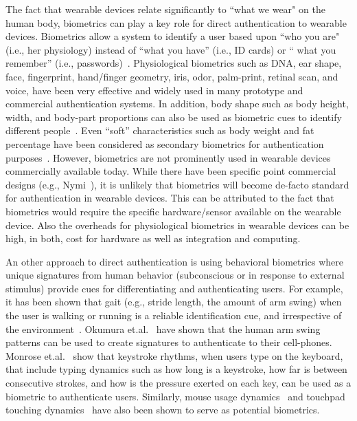 The fact that wearable devices relate significantly to ``what we wear" on the
human body, biometrics can play a key role for direct authentication to
wearable
devices. Biometrics allow a system to identify a user based upon ``who you
are" (i.e., her physiology) instead of ``what you
have'' (i.e., ID cards) or `` what you remember'' (i.e.,
passwords)~\cite{jain2004introduction,o2003comparing,yampolskiy2007motor}.
Physiological biometrics such as DNA, ear shape, face, fingerprint,
hand/finger geometry,
iris, odor, palm-print, retinal scan, and voice, have been very effective and
widely used in many prototype and commercial authentication systems.
In addition, body shape such as body height, width, and body-part proportions
can also be used as biometric cues to identify different
people~\cite{collins2002silhouette}. Even ``soft'' characteristics such as
body weight and fat percentage have been considered as secondary biometrics
for authentication purposes~\cite{ailisto2006soft}. However, biometrics are
not prominently used in wearable devices commercially available today.
While there have been specific point commercial designs (e.g., Nymi~\cite{nymi}), it is unlikely that biometrics will become de-facto standard
for authentication in wearable devices. This can be attributed to the
fact that biometrics would require the specific hardware/sensor available on
the wearable device. Also the overheads for physiological biometrics in
wearable devices can be high, in both, cost for hardware as well as
integration and computing.

An other approach to direct authentication is using behavioral biometrics
where unique signatures from human behavior (subconscious
or in response to external stimulus) provide cues for differentiating and
authenticating users. For example, it has been shown that gait (e.g.,
stride length, the
amount of arm swing) when the user is walking or
running is a reliable identification cue, and irrespective of the
environment~\cite{stevenage1999visual}. Okumura et.al.~\cite{okumura2006study}
have shown that the human arm swing patterns can be used to create signatures
to authenticate to their cell-phones. Monrose
et.al.~\cite{monrose2000keystroke} show that keystroke rhythms, when
users type on the keyboard, that include typing dynamics such as how
long is a keystroke, how far is between consecutive strokes, and how is the
pressure exerted on each key, can be used as a biometric to authenticate
users. Similarly, mouse usage dynamics~\cite{jorgensen2011mouse} and touchpad
touching dynamics~\cite{bo2013silentsense,de2012touch} have also been shown to
serve as potential biometrics.

